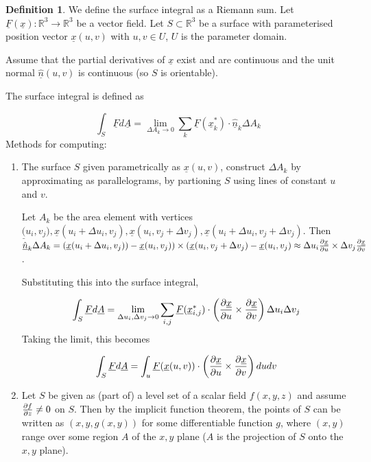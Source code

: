 \documentclass[12pt,a4paper]{article}
\theoremstyle{definition}
\newtheorem{definition}{Definition}[subsection]
\begin{document}
\begin{definition}
	We define the surface integral as a Riemann sum. Let $\underline{F}(\underline{x}): \mathbb{R}^3 \rightarrow \mathbb{R}^3$ be a vector field. Let $S \subset \mathbb{R}^3$ be a surface with parameterised position vector $\underline{x}(u, v)$ with $u, v \in U$, $U$ is the parameter domain.

	Assume that the partial derivatives of $\underline{x}$ exist and are continuous and the unit normal $\hat{\underline{n}}(u, v)$ is continuous (so $S$ is orientable).

	The surface integral is defined as

	\[ \int_S \underline{F} d\underline{A} = \lim_{\Delta A_k \rightarrow 0} \sum_k \underline{F} (\underline{x}_{k}^*) \cdot \underline{\hat{n}}_k \Delta A_k \]
	Methods for computing:

	\begin{enumerate}
		\item The surface $S$ given parametrically as $\underline{x}(u, v)$, construct $\Delta A_k$ by approximating as parallelograms, by partioning $S$ using lines of constant $u$ and $v$.
		
		Let $A_k$ be the area element with vertices $\underline(u_i, v_j), \underline{x}(u_i + \Delta u_i, v_j), \underline{x}(u_i, v_j + \Delta v_j), \underline{x}(u_i + \Delta u_i, v_j + \Delta v_j)$. Then $\underline{\hat{n}}_k \Delta A_k = (\underline{x}(u_i + \Delta u_i, v_j)) - \underline{x}(u_i, v_j)) \times (\underline{x}(u_i, v_j + \Delta v_j) - \underline{x}(u_i, v_j) \approx \Delta u_i \diffp{\underline{x}}{u} \times \Delta v_j \diffp{\underline{x}}{v}$.

		Substituting this into the surface integral,

		\[ \int_S \underline{F} d\underline{A} = \lim_{\Delta u_i, \Delta v_j \rightarrow 0} \sum_{i, j} \underline{F}(\underline{x}_{i, j}^*) \cdot \left( \diffp{\underline{x}}{u} \times \diffp{\underline{x}}{v} \right) \Delta u_i \Delta v_j \]
		Taking the limit, this becomes

		\[ \int_S \underline{F} d\underline{A} = \int_u \underline{F}(\underline{x}(u, v)) \cdot \left( \diffp{\underline{x}}{u} \times \diffp{\underline{x}}{v} \right) du dv \]

		\item Let $S$ be given as (part of) a level set of a scalar field $f(x, y, z)$ and assume $\diffp{f}{z} \ne 0$ on $S$. Then by the implicit function theorem, the points of $S$ can be written as $(x, y, g(x, y))$ for some differentiable function $g$, where $(x, y)$ range over some region $A$ of the $x, y$ plane ($A$ is the projection of $S$ onto the $x, y$ plane).
		

\end{enumerate}
\end{definition}
\end{document}

